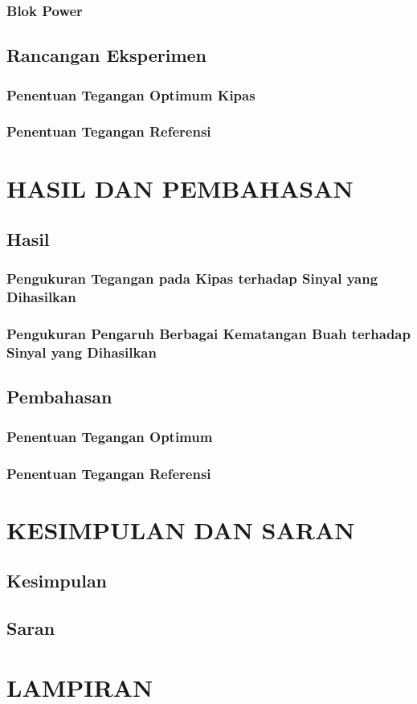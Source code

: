 \documentclass[12pt,a4paper]{report}
\begin{document}
	\subsection{Blok Power}
			
	\section{Rancangan Eksperimen}
		
	\subsection{Penentuan Tegangan Optimum Kipas}
		
	\subsection{Penentuan Tegangan Referensi}
			
\chapter{HASIL DAN PEMBAHASAN}
	\section{Hasil}
	\subsection{Pengukuran Tegangan pada Kipas terhadap Sinyal yang Dihasilkan}
		
	\subsection{Pengukuran Pengaruh Berbagai Kematangan Buah terhadap Sinyal yang Dihasilkan}
		
	\section{Pembahasan}
	\subsection{Penentuan Tegangan Optimum}
		
	\subsection{Penentuan Tegangan Referensi}
		
\chapter{KESIMPULAN DAN SARAN}
	\section{Kesimpulan}
	\section{Saran}

\printbibliography
\chapter*{\centering LAMPIRAN}
\end{document}
